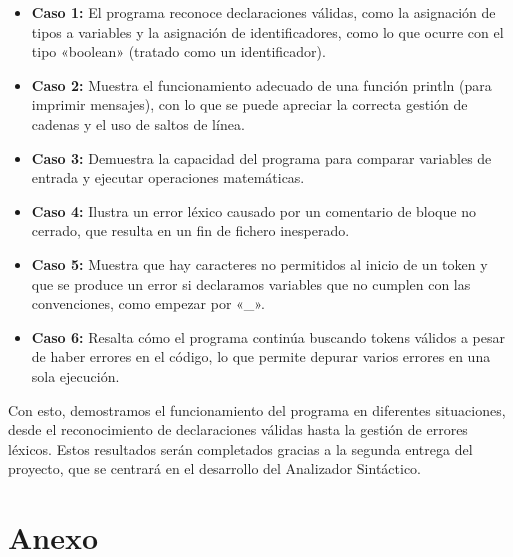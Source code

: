 \documentclass{article}
\begin{document}
\begin{itemize}
    \item \textbf{Caso 1:} El programa reconoce declaraciones válidas, como la asignación de tipos a variables y la asignación de identificadores, como lo que ocurre con el tipo «boolean» (tratado como un identificador).
    
    \item \textbf{Caso 2:} Muestra el funcionamiento adecuado de una función println (para imprimir mensajes), con lo que se puede apreciar la correcta gestión de cadenas y el uso de saltos de línea.
    
    \item \textbf{Caso 3:} Demuestra la capacidad del programa para comparar variables de entrada y ejecutar operaciones matemáticas.
    
    \item \textbf{Caso 4:} Ilustra un error léxico causado por un comentario de bloque no cerrado, que resulta en un fin de fichero inesperado.
    
    \item \textbf{Caso 5:} Muestra que hay caracteres no permitidos al inicio de un token y que se produce un error si declaramos variables que no cumplen con las convenciones, como empezar por «\_».
    
    \item \textbf{Caso 6:} Resalta cómo el programa continúa buscando tokens válidos a pesar de haber errores en el código, lo que permite depurar varios errores en una sola ejecución.
\end{itemize}

Con esto, demostramos el funcionamiento del programa en diferentes situaciones, desde el reconocimiento de declaraciones válidas hasta la gestión de errores léxicos. Estos resultados serán completados gracias a la segunda entrega del proyecto, que se centrará en el desarrollo del Analizador Sintáctico.

\appendix
\section*{Anexo}

\end{document}
